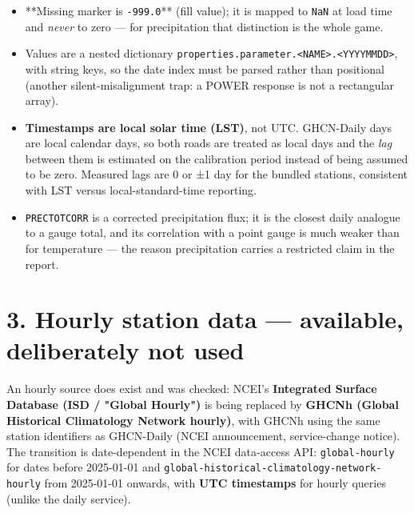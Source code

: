 \documentclass[10pt,a4paper]{article}
\begin{document}
\begin{itemize}
\item **Missing marker is \texttt{-\allowbreak{}999.0}** (fill value); it is mapped to \texttt{NaN} at load time
and \emph{never} to zero — for precipitation that distinction is the whole game.

\item Values are a nested dictionary \texttt{properties.parameter.<NAME>.<YYYYMMDD>}, with
string keys, so the date index must be parsed rather than positional (another silent-\allowbreak{}misalignment trap: a POWER response is not a rectangular array).

\item \textbf{Timestamps are local solar time (LST)}, not UTC. GHCN-\allowbreak{}Daily days are local
calendar days, so both roads are treated as local days and the \emph{lag} between them is estimated on the calibration period instead of being assumed to be zero. Measured lags are 0 or ±1 day for the bundled stations, consistent with LST versus local-\allowbreak{}standard-\allowbreak{}time reporting.

\item \texttt{PRECTOTCORR} is a corrected precipitation flux; it is the closest daily
analogue to a gauge total, and its correlation with a point gauge is much weaker than for temperature — the reason precipitation carries a restricted claim in the report.

\end{itemize}

\section*{3. Hourly station data — available, deliberately not used}
An hourly source does exist and was checked: NCEI's \textbf{Integrated Surface Database (ISD /\allowbreak{} "Global Hourly")} is being replaced by \textbf{GHCNh (Global Historical Climatology Network hourly)}, with GHCNh using the same station identifiers as GHCN-\allowbreak{}Daily (NCEI announcement, service-\allowbreak{}change notice). The transition is date-\allowbreak{}dependent in the NCEI data-\allowbreak{}access API: \texttt{global-\allowbreak{}hourly} for dates before 2025-\allowbreak{}01-\allowbreak{}01 and \texttt{global-\allowbreak{}historical-\allowbreak{}climatology-\allowbreak{}network-\allowbreak{}hourly} from 2025-\allowbreak{}01-\allowbreak{}01 onwards, with \textbf{UTC timestamps} for hourly queries (unlike the daily service).
\end{document}
